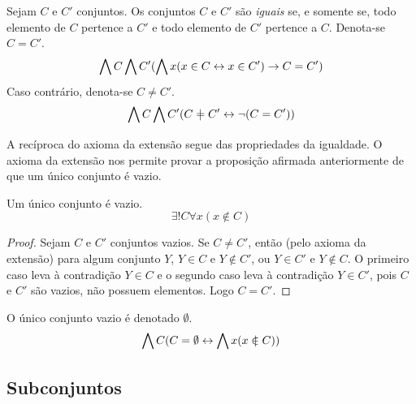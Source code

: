 \begin{axiom}[Extensão]
Sejam $C$ e $C'$ conjuntos. Os conjuntos $C$ e $C'$ são \emph{iguais} se, e somente se, todo elemento de $C$ pertence a $C'$ e todo elemento de $C'$ pertence a $C$. Denota-se $C=C'$.
	\begin{equation*}
	\bigwedge\nolimits C \bigwedge\nolimits C' (\bigwedge\nolimits x (x \in C \leftrightarrow x \in C') \rightarrow C = C')
	\end{equation*}
Caso contrário, denota-se $C \neq C'$.
	\begin{equation*}
	\forall C \forall C' (C \neq C' \lequiv \lnao (C = C'))
	\end{equation*}
\end{axiom}

A recíproca do axioma da extensão segue das propriedades da igualdade. O axioma da extensão nos permite provar a proposição afirmada anteriormente de que um único conjunto é vazio.

\begin{proposition}
Um único conjunto é vazio.
	\begin{equation*}
	\exists! C \forall x(x \notin C)
	\end{equation*}
\end{proposition}
\begin{proof}
Sejam $C$ e $C'$ conjuntos vazios. Se $C \neq C'$, então (pelo axioma da extensão) para algum conjunto $Y$, $Y \in C$ e $Y \notin C'$, ou $Y \in C'$ e $Y \notin C$. O primeiro caso leva à contradição $Y \in C$ e o segundo caso leva à contradição $Y \in C'$, pois $C$ e $C'$ são vazios, não possuem elementos. Logo $C = C'$.
\end{proof}

\begin{definition}
O único conjunto vazio é denotado $\emptyset$.
	\begin{equation*}
	\forall C(C=\emptyset \lequiv \forall x(x \notin C))
	\end{equation*}
\end{definition}

\subsection{Subconjuntos}

